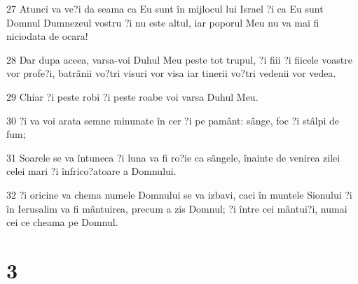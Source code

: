 \par 27 Atunci va ve?i da seama ca Eu sunt în mijlocul lui Israel ?i ca Eu sunt Domnul Dumnezeul vostru ?i nu este altul, iar poporul Meu nu va mai fi niciodata de ocara!
\par 28 Dar dupa aceea, varsa-voi Duhul Meu peste tot trupul, ?i fiii ?i fiicele voastre vor profe?i, batrânii vo?tri visuri vor visa iar tinerii vo?tri vedenii vor vedea.
\par 29 Chiar ?i peste robi ?i peste roabe voi varsa Duhul Meu.
\par 30 ?i va voi arata semne minunate în cer ?i pe pamânt: sânge, foc ?i stâlpi de fum;
\par 31 Soarele se va întuneca ?i luna va fi ro?ie ca sângele, înainte de venirea zilei celei mari ?i înfrico?atoare a Domnului.
\par 32 ?i oricine va chema numele Domnului se va izbavi, caci în muntele Sionului ?i în Ierusalim va fi mântuirea, precum a zis Domnul; ?i între cei mântui?i, numai cei ce cheama pe Domnul.

\chapter{3}

